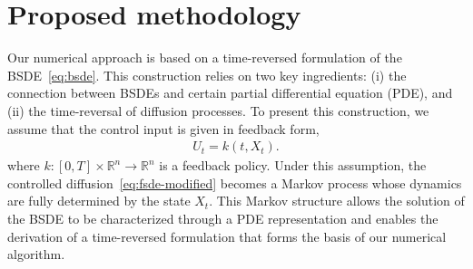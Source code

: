\documentclass[letterpaper, 10 pt, conference]{ieeeconf}  %
\def\Re{\mathbb{R}}
\def\R{\mathbb{R}}
\newcommand{\field}[1]{\mathbb{#1}}
\def\Re{\field{R}}
\def\R{\mathbb{R}}
\newcommand{\trace}{\text{Tr}}
\newcommand{\ud}{\,\mathrm{d}}
\def\Re{\mathbb{R}}
\renewcommand{\Re}{\mathbb{R}}
\begin{document}



\section{Proposed methodology}\label{sec:method}
Our numerical approach is based on a time-reversed formulation of the BSDE~\eqref{eq:bsde}.  This construction relies on two key ingredients: (i) the connection between BSDEs and certain partial differential equation (PDE), and (ii) the time-reversal of diffusion processes. To present this construction, we assume that the control input is given in feedback form,
\begin{align}\label{eq:feedback}
    U_t = k(t,X_t).
\end{align}
where $k:[0,T]\times \Re^n \to \Re^n$ is a feedback policy. Under this assumption, the controlled diffusion~\eqref{eq:fsde-modified} becomes a Markov process whose dynamics are fully determined by the state $X_t$. This Markov structure allows the solution of the BSDE to be characterized through a PDE representation and enables the derivation of a time-reversed formulation that forms the basis of our numerical algorithm.
\end{document}
